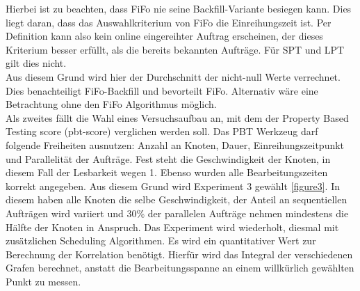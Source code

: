 Hierbei ist zu beachten, dass FiFo nie seine Backfill-Variante besiegen kann. Dies liegt daran, dass das Auswahlkriterium von FiFo die Einreihungszeit ist. Per Definition kann also kein online eingereihter Auftrag erscheinen, der dieses Kriterium besser erfüllt, als die bereits bekannten Aufträge. Für SPT und LPT gilt dies nicht.\\
Aus diesem Grund wird hier der Durchschnitt der nicht-null Werte verrechnet. Dies benachteiligt FiFo-Backfill und bevorteilt FiFo. Alternativ wäre eine Betrachtung ohne den FiFo Algorithmus möglich.\\
Als zweites fällt die Wahl eines Versuchsaufbau an, mit dem der Property Based Testing score (pbt-score) verglichen werden soll. Das PBT Werkzeug darf folgende Freiheiten ausnutzen: Anzahl an Knoten, Dauer, Einreihungszeitpunkt und Parallelität der Aufträge. Fest steht die Geschwindigkeit der Knoten, in diesem Fall der Lesbarkeit wegen 1. Ebenso wurden alle Bearbeitungszeiten korrekt angegeben. Aus diesem Grund wird Experiment 3 gewählt \ref{figure3}. In diesem haben alle Knoten die selbe Geschwindigkeit, der Anteil an sequentiellen Aufträgen wird variiert und 30\% der parallelen Aufträge nehmen mindestens die Hälfte der Knoten in Anspruch. Das Experiment wird wiederholt, diesmal mit zusätzlichen Scheduling Algorithmen. Es wird ein quantitativer Wert zur Berechnung der Korrelation benötigt. Hierfür wird das Integral der verschiedenen Grafen berechnet, anstatt die Bearbeitungsspanne an einem willkürlich gewählten Punkt zu messen.\\


